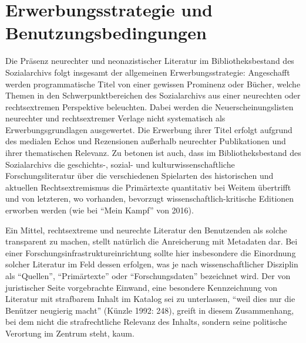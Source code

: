 \documentclass[a4paper,
fontsize=11pt,
oneside,
numbers=noperiodatend,
parskip=half-,
bibliography=totoc,
final
]{scrartcl}
\begin{document}
\hypertarget{erwerbungsstrategie-und-benutzungsbedingungen}{%
\section*{Erwerbungsstrategie und
Benutzungsbedingungen}\label{erwerbungsstrategie-und-benutzungsbedingungen}}

Die Präsenz neurechter und neonazistischer Literatur im
Bibliotheksbestand des Sozialarchivs folgt insgesamt der allgemeinen
Erwerbungsstrategie: Angeschafft werden programmatische Titel von einer
gewissen Prominenz oder Bücher, welche Themen in den
Schwerpunktbereichen des Sozialarchivs aus einer neurechten oder
rechtsextremen Perspektive beleuchten. Dabei werden die
Neuerscheinungslisten neurechter und rechtsextremer Verlage nicht
systematisch als Erwerbungsgrundlagen ausgewertet. Die Erwerbung ihrer
Titel erfolgt aufgrund des medialen Echos und Rezensionen außerhalb
neurechter Publikationen und ihrer thematischen Relevanz. Zu betonen ist
auch, dass im Bibliotheksbestand des Sozialarchivs die geschichts-,
sozial- und kulturwissenschaftliche Forschungsliteratur über die
verschiedenen Spielarten des historischen und aktuellen
Rechtsextremismus die Primärtexte quantitativ bei Weitem übertrifft und
von letzteren, wo vorhanden, bevorzugt wissenschaftlich-kritische
Editionen erworben werden (wie bei \enquote{Mein Kampf} von 2016).

Ein Mittel, rechtsextreme und neurechte Literatur den Benutzenden als
solche transparent zu machen, stellt natürlich die Anreicherung mit
Metadaten dar. Bei einer Forschungsinfrastruktureinrichtung sollte hier
insbesondere die Einordnung solcher Literatur im Feld dessen erfolgen,
was je nach wissenschaftlicher Disziplin als \enquote{Quellen},
\enquote{Primärtexte} oder \enquote{Forschungsdaten} bezeichnet wird.
Der von juristischer Seite vorgebrachte Einwand, eine besondere
Kennzeichnung von Literatur mit strafbarem Inhalt im Katalog sei zu
unterlassen, \enquote{weil dies nur die Benützer neugierig macht}
(Künzle 1992: 248), greift in diesem Zusammenhang, bei dem nicht die
strafrechtliche Relevanz des Inhalts, sondern seine politische Verortung
im Zentrum steht, kaum.
\end{document}
